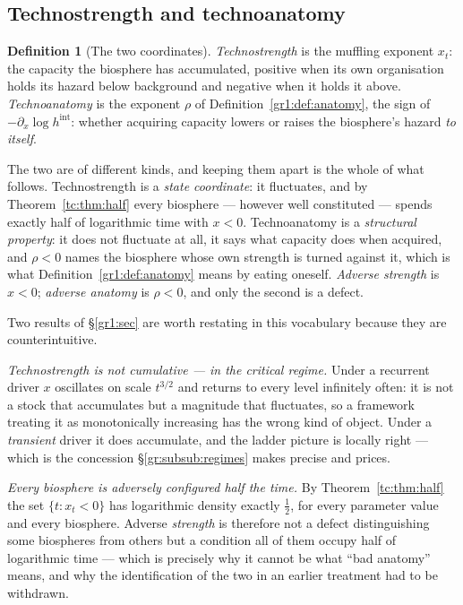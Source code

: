 \documentclass[11pt]{article}
\numberwithin{equation}{section}
\theoremstyle{plain}
\theoremstyle{definition}
\newtheorem{definition}[theorem]{Definition}
\theoremstyle{remark}
\begin{document}
\subsection{Technostrength and technoanatomy}\label{gr:sub:coords}

\begin{definition}[The two coordinates]\label{gr:def:coords}
\emph{Technostrength} is the muffling exponent $x_t$: the capacity the
biosphere has accumulated, positive when its own organisation holds its
hazard below background and negative when it holds it above.
\emph{Technoanatomy} is the exponent $\rho$ of
Definition~\ref{gr1:def:anatomy}, the sign of
$-\partial_x\log h^{\mathrm{int}}$: whether acquiring capacity lowers or
raises the biosphere's hazard \emph{to itself}.

The two are of different kinds, and keeping them apart is the whole of
what follows. Technostrength is a \emph{state coordinate}: it
fluctuates, and by Theorem~\ref{tc:thm:half} every biosphere ---
however well constituted --- spends exactly half of logarithmic time
with $x<0$. Technoanatomy is a \emph{structural property}: it does not
fluctuate at all, it says what capacity does when acquired, and
$\rho<0$ names the biosphere whose own strength is turned against it,
which is what Definition~\ref{gr1:def:anatomy} means by eating oneself.
\emph{Adverse strength} is $x<0$; \emph{adverse anatomy} is $\rho<0$,
and only the second is a defect.
\end{definition}

Two results of \S\ref{gr1:sec} are worth restating in this vocabulary because
they are counterintuitive.

\emph{Technostrength is not cumulative --- in the critical regime.}
Under a recurrent driver $x$ oscillates on scale $t^{3/2}$ and returns
to every level infinitely often: it is not a stock that accumulates but
a magnitude that fluctuates, so a framework treating it as monotonically
increasing has the wrong kind of object. Under a \emph{transient} driver
it does accumulate, and the ladder picture is locally right --- which is
the concession \S\ref{gr:subsub:regimes} makes precise and prices.

\emph{Every biosphere is adversely configured half the time.} By
Theorem~\ref{tc:thm:half} the set $\{t:x_t<0\}$ has logarithmic density
exactly $\tfrac12$, for every parameter value and every biosphere.
Adverse \emph{strength} is therefore not a defect distinguishing some
biospheres from others but a condition all of them occupy half of
logarithmic time --- which is precisely why it cannot be what
``bad anatomy'' means, and why the identification of the two in an
earlier treatment had to be withdrawn.
\end{document}

